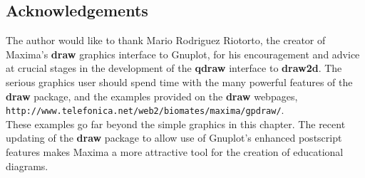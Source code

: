 \documentclass[12pt]{article}
\begin{document}
\subsection{Acknowledgements}
The author would like to thank Mario Rodriguez Riotorto, the creator of Maxima's \textbf{draw}
 graphics interface to Gnuplot, for his encouragement and advice at crucial stages
  in the development of the \textbf{qdraw} interface to \textbf{draw2d}.
The serious graphics user should spend time with the many powerful features of the
  \textbf{draw} package, and the examples provided on the \textbf{draw} webpages,\\
  \verb|http://www.telefonica.net/web2/biomates/maxima/gpdraw/|.\\
These examples go far beyond the simple graphics in this chapter.
The recent updating of the \textbf{draw} package to allow use of
  Gnuplot's enhanced postscript features makes Maxima a more attractive tool
  for the creation of educational diagrams.
\end{document}
